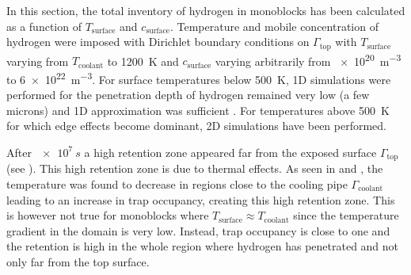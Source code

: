 In this section, the total inventory of hydrogen in monoblocks has been calculated as a function of $T_\mathrm{surface}$ and $c_\mathrm{surface}$.
Temperature and mobile concentration of hydrogen were imposed with Dirichlet boundary conditions on $\Gamma_\mathrm{top}$ with $T_\mathrm{surface}$ varying from $T_\mathrm{coolant}$ to \SI{1200}{K} and $c_\mathrm{surface}$ varying arbitrarily from \SI{e20}{m^{-3}} to \SI{6e22}{m^{-3}}.
For surface temperatures below \SI{500}{K}, 1D simulations were performed for the penetration depth of hydrogen remained very low (a few microns) and 1D approximation was sufficient .
For temperatures above \SI{500}{K} for which edge effects become dominant, 2D simulations have been performed.

After $ \SI{e7}{s}$ a high retention zone appeared far from the exposed surface $\Gamma_\mathrm{top}$ (see ).
This high retention zone is due to thermal effects.
As seen in  and , the temperature was found to decrease in regions close to the cooling pipe $\Gamma_\mathrm{coolant}$ leading to an increase in trap occupancy, creating this high retention zone.
This is however not true for monoblocks where $T_\mathrm{surface} \approx T_\mathrm{coolant}$ since the temperature gradient in the domain is very low.
Instead, trap occupancy is close to one and the retention is high in the whole region where hydrogen has penetrated and not only far from the top surface.

